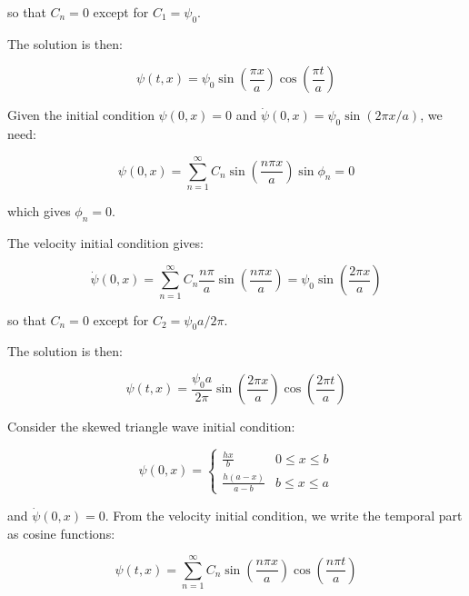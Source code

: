 \documentclass[12pt]{article}
\begin{document}
so that $C_{n} = 0$ except for $C_{1} = \psi_{0}$.

The solution is then:

\begin{equation}
    \psi(t, x) = \psi_{0} \sin{\left( \frac{\pi x}{a} \right)} \cos{\left( \frac{\pi t}{a} \right)}
\end{equation}

Given the initial condition $\psi(0, x) = 0$ and $\dot{\psi}(0, x) = \psi_{0} \sin{(2\pi x/a)}$, we need:

\begin{equation}
    \psi(0, x) = \sum_{n = 1}^{\infty} C_{n} \sin{\left( \frac{n \pi x}{a} \right)} \sin{\phi_{n}} = 0
\end{equation}

which gives $\phi_{n} = 0$.

The velocity initial condition gives:

\begin{equation}
    \dot{\psi}(0, x) = \sum_{n = 1}^{\infty} C_{n} \frac{n \pi}{a} \sin{\left( \frac{n \pi x}{a} \right)} = \psi_{0} \sin{\left( \frac{2 \pi x}{a} \right)}
\end{equation}

so that $C_{n} = 0$ except for $C_{2} = \psi_{0}a/2\pi$.

The solution is then:

\begin{equation}
    \psi(t, x) = \frac{\psi_{0} a}{2\pi} \sin{\left( \frac{2 \pi x}{a} \right)} \cos{\left( \frac{2 \pi t}{a} \right)}
\end{equation}

Consider the skewed triangle wave initial condition:

\begin{equation}
\psi(0, x) = \begin{cases}
    \frac{hx}{b} & 0 \leq x \leq b \\
    \frac{h(a-x)}{a-b} & b \leq x \leq a
\end{cases}
\end{equation}

and $\dot{\psi}(0, x) = 0$. From the velocity initial condition, we write the temporal part as cosine functions:

\begin{equation}
    \psi(t, x) = \sum_{n = 1}^{\infty} C_{n} \sin{\left( \frac{n \pi x}{a} \right)} \cos{\left( \frac{n \pi t}{a} \right)}
\end{equation}
\end{document}

